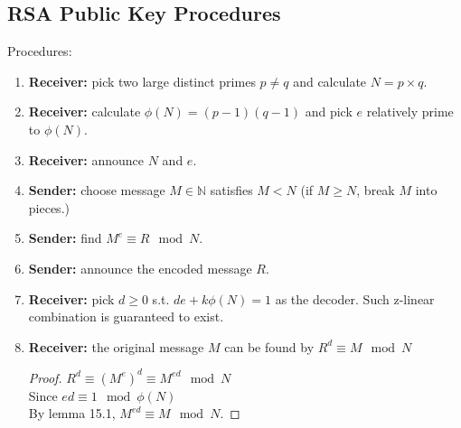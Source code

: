 \documentclass[11pt]{article}
\begin{document}
		\subsection{RSA Public Key Procedures}
		\par Procedures:
		\begin{enumerate}
			\item \textbf{Receiver:} pick two large distinct primes $p \neq q$ and calculate $N = p\times q$.
			\item \textbf{Receiver:} calculate $\phi(N) = (p-1)(q-1)$ and pick $e$ relatively prime to $\phi(N)$. 
			\item \textbf{Receiver:} announce $N$ and $e$.
			\item \textbf{Sender:} choose message $M \in \mathbb{N}$ satisfies $M < N$ (if $M \geq N$, break $M$ into pieces.)
			\item \textbf{Sender:} find $M^e \equiv R \mod N$. 
			\item \textbf{Sender:} announce the encoded message $R$. 
			\item \textbf{Receiver:} pick $d \geq 0$ s.t. $de + k\phi(N) = 1$ as the decoder. Such z-linear combination is guaranteed to exist.
			\item \textbf{Receiver:} the original message $M$ can be found by $R^d \equiv M \mod N$
			\begin{proof}
				$R^d \equiv (M^e)^d \equiv M^{ed} \mod N$ \\
				Since $ed \equiv 1 \mod \phi(N)$ \\
				By lemma 15.1, $M^{ed} \equiv M \mod N$.
			\end{proof}
		\end{enumerate}
\end{document}
